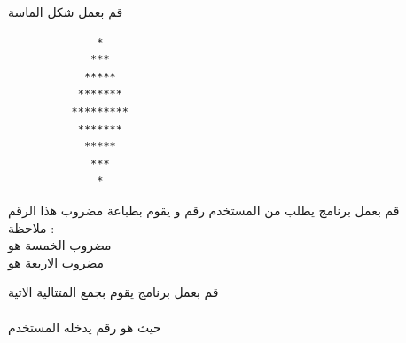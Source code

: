 \begin{task}
  \begin{AR}
    قم بعمل شكل الماسة 
  \end{AR}
  \begin{verbatim}
              *
             ***
            *****
           *******
          *********
           *******
            *****
             ***
              *
  \end{verbatim}

\end{task}
\begin{task}
  \begin{AR}
    قم بعمل برنامج يطلب من المستخدم رقم و يقوم بطباعة مضروب هذا الرقم
    \\
    ملاحظة : 
    \\
    مضروب الخمسة هو 
    \\
    مضروب الاربعة هو 
  \end{AR}
\end{task}
\begin{task}
  \begin{AR}
    قم بعمل برنامج يقوم بجمع المتتالية الاتية 
    \\
    \\
    حيث  هو رقم يدخله المستخدم
  \end{AR}
\end{task}

